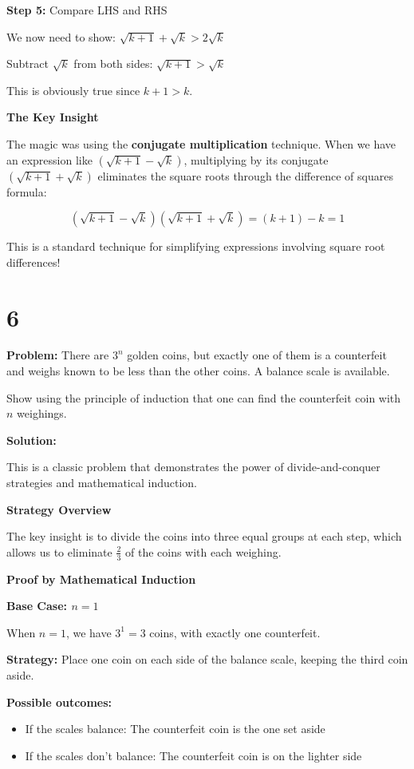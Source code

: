 \documentclass[12pt,a4paper]{article}
\theoremstyle{definition}
\theoremstyle{remark}
\begin{document}
\textbf{Step 5:} Compare LHS and RHS

We now need to show: $\sqrt{k+1} + \sqrt{k} > 2\sqrt{k}$

Subtract $\sqrt{k}$ from both sides: $\sqrt{k+1} > \sqrt{k}$

This is obviously true since $k+1 > k$.

\textbf{The Key Insight}

The magic was using the \textbf{conjugate multiplication} technique. When we have an expression like $(\sqrt{k+1} - \sqrt{k})$, multiplying by its conjugate $(\sqrt{k+1} + \sqrt{k})$ eliminates the square roots through the difference of squares formula:

$$(\sqrt{k+1} - \sqrt{k})(\sqrt{k+1} + \sqrt{k}) = (k+1) - k = 1$$

This is a standard technique for simplifying expressions involving square root differences!


\section*{6}

\textbf{Problem:} There are $3^n$ golden coins, but exactly one of them is a counterfeit and weighs known to be less than the other coins. A balance scale is available.

Show using the principle of induction that one can find the counterfeit coin with $n$ weighings.

\textbf{Solution:}

This is a classic problem that demonstrates the power of divide-and-conquer strategies and mathematical induction.

\textbf{Strategy Overview}

The key insight is to divide the coins into three equal groups at each step, which allows us to eliminate $\frac{2}{3}$ of the coins with each weighing.

\textbf{Proof by Mathematical Induction}

\textbf{Base Case: $n = 1$}

When $n = 1$, we have $3^1 = 3$ coins, with exactly one counterfeit.

\textbf{Strategy:} Place one coin on each side of the balance scale, keeping the third coin aside.

\textbf{Possible outcomes:}
\begin{itemize}
\item If the scales balance: The counterfeit coin is the one set aside
\item If the scales don't balance: The counterfeit coin is on the lighter side
\end{itemize}
\end{document}
